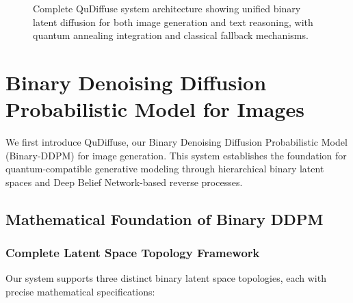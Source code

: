 \documentclass{article}
\begin{document}
\begin{figure}[H]
\caption{Complete QuDiffuse system architecture showing unified binary latent diffusion for both image generation and text reasoning, with quantum annealing integration and classical fallback mechanisms.}
\label{fig:system_overview}
\end{figure}

\section{Binary Denoising Diffusion Probabilistic Model for Images}

We first introduce QuDiffuse, our Binary Denoising Diffusion Probabilistic Model (Binary-DDPM) for image generation. This system establishes the foundation for quantum-compatible generative modeling through hierarchical binary latent spaces and Deep Belief Network-based reverse processes.

\subsection{Mathematical Foundation of Binary DDPM}

\subsubsection{Complete Latent Space Topology Framework}

Our system supports three distinct binary latent space topologies, each with precise mathematical specifications:
\end{document}
